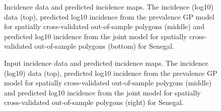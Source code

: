 \documentclass{statsoc}
\begin{document}
\begin{figure}
\caption{\label{predobsmapsen}
Incidence data and predicted incidence maps.
The incidence (log10) data (top), predicted log10 incidence from the prevalence GP model for spatially cross-validated out-of-sample polygons (middle) and predicted log10 incidence from the joint model for spatially cross-validated out-of-sample polygons (bottom) for Senegal.
}

\end{figure}



\begin{figure}
\caption{\label{predobsmapmdg}Input incidence data and predicted incidence maps.
The incidence (log10) data (top), predicted log10 incidence from the prevalence GP model for spatially cross-validated out-of-sample polygons (middle) and predicted log10 incidence from the joint model for spatially cross-validated out-of-sample polygons (right) for Senegal.
}

\end{figure}
\end{document}
